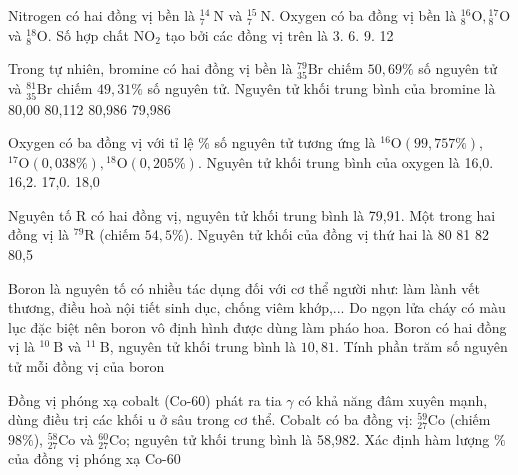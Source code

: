 \begin{ex}[2]
	Nitrogen có hai đồng vị bền là ${ }_7^{14} \mathrm{~N}$ và ${ }_7^{15} \mathrm{~N}$. Oxygen có ba đồng vị bền là ${ }_8^{16} \mathrm{O},{ }_8^{17} \mathrm{O}$ và ${ }_8^{18} \mathrm{O}$. Số hợp chất $\mathrm{NO}_2$ tạo bởi các đồng vị trên là
	\choice
	{ 3.}
	{ 6.}
	{ 9.}
	{ 12}
	\loigiai{%
	}
\end{ex}
\begin{ex}[2]
	Trong tự nhiên, bromine có hai đồng vị bền là ${ }_{35}^{79} \mathrm{Br}$ chiếm $50,69 \%$ số nguyên tử và ${ }_{35}^{81} \mathrm{Br}$ chiếm $49,31 \%$ số nguyên tử. Nguyên tử khối trung bình của bromine là
	\choice
	{ 80,00}
	{ 80,112}
	{ 80,986}
	{ 79,986}
	\loigiai{%
	}
\end{ex}
\begin{ex}[2]
	Oxygen có ba đồng vị với tỉ lệ \% số nguyên tử tương ứng là ${ }^{16} \mathrm{O}(99,757 \%)$, ${ }^{17} \mathrm{O}(0,038 \%),{ }^{18} \mathrm{O}(0,205 \%)$. Nguyên tử khối trung bình của oxygen là
	\choice
	{ 16,0.}
	{ 16,2.}
	{ 17,0.}
	{ 18,0}
	\loigiai{%
	}
\end{ex}
\begin{ex}[2]
	Nguyên tố R có hai đồng vị, nguyên tử khối trung bình là 79,91. Một trong hai đồng vị là ${ }^{79} \mathrm{R}$ (chiếm $54,5 \%$). Nguyên tử khối của đồng vị thứ hai là
	\choice
	{ 80}
	{ 81}
	{ 82}
	{ 80,5}
	\loigiai{%
	}
\end{ex}
\begin{ex}[2]
	Boron là nguyên tố có nhiều tác dụng đối với cơ thể người như: làm lành vết thương, điều hoà nội tiết sinh dục, chống viêm khớp,... Do ngọn lửa cháy có màu lục đặc biệt nên boron vô định hình được dùng làm pháo hoa. Boron có hai đồng vị là ${ }^{10} \mathrm{~B}$ và ${ }^{11} \mathrm{~B}$, nguyên tử khối trung bình là $10,81$. Tính phần trăm số nguyên tử mỗi đồng vị của boron
\loigiai{%
}
\end{ex}
\begin{ex}[2]
Đồng vị phóng xạ cobalt (Co-60) phát ra tia $\gamma$ có khả năng đâm xuyên mạnh, dùng điều trị các khối u ở sâu trong cơ thể. Cobalt có ba đồng vị: ${ }_{27}^{59} \mathrm{Co}$ (chiếm $98 \%$), ${ }_{27}^{58} \mathrm{Co}$ và ${ }_{27}^{60} \mathrm{Co}$; nguyên tử khối trung bình là 58,982. Xác định hàm lượng $\%$ của đồng vị phóng xạ Co-60
\loigiai{%
}
\end{ex}








